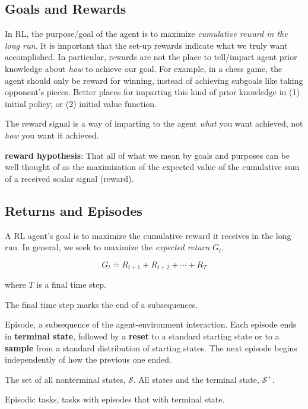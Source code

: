\documentclass[lang=en,mode=geye,device=normal,color=blue,14pt]{elegantnote}
\DeclareMathOperator*{\1}{\mathbbm{1}}
\begin{document}
\subsection{Goals and Rewards}
 In RL, the purpose/goal of the agent is to maximize \textit{cumulative reward in the long run}.
 It is important that the set-up rewards indicate what we truly want accomplished.
 In particular, rewards are not the place to tell/impart agent prior knowledge about \textit{how} to achieve our goal.
 For example, in a chess game, the agent should only be reward for winning, instead of achieving subgoals like taking opponent's pieces.
 Better places for imparting this kind of prior knowledge in (1) initial policy; or (2) initial value function.
 
The reward signal is a way of imparting to the agent \textit{what} you want achieved, not \textit{how} you want it achieved.

\textbf{reward hypothesis}: That all of what we mean by goals and purposes can be well thought of as the maximization of the expected value of the cumulative sum of a received scalar signal (reward).

\subsection{Returns and Episodes}

A RL agent's goal is to maximize the cumulative reward it receives in the long run.
In general, we seek to maximize the \textit{expected return} $G_t$.

$$ G_t \doteq R_{t+1} + R_{t+2} + \cdots + R_T $$

where $T$ is a final time step.

The final time step marks the end of a subsequences.

\begin{definition}
Episode, a subsequence of the agent-environment interaction. Each episode ends in \textbf{terminal state}, followed by a \textbf{reset} to a standard starting state or to a \textbf{sample} from a standard distribution of starting states. The next episode begins independently of how the previous one ended.
\end{definition}

The set of all nonterminal states, $\mathcal{S}$. All states and the terminal state, $\mathcal{S^+}$.

\begin{definition}
Episodic tasks, tasks with episodes that with terminal state.
\end{definition}
\end{document}
